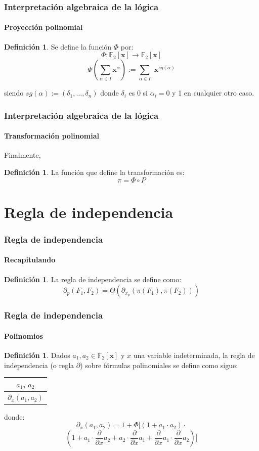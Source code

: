 \documentclass[12pt,a4paper]{beamer}
\theoremstyle{definition}
\newtheorem{defn}[thm]{Definición}
\theoremstyle{remark}
\begin{document}
\begin{frame}
\frametitle{Interpretación algebraica de la lógica}
\framesubtitle{Proyección polinomial}
\begin{defn}
Se define la función $\Phi$ por:
 $$\Phi:\mathbb{F}_2[\textbf{x}] \rightarrow \mathbb{F}_2[\textbf{x}]$$
 $$\Phi (\sum\limits_{\alpha \in I} \textbf{x}^{\alpha} ) := \sum\limits_{\alpha
 \in I} \textbf{ x}^{sg(\alpha)} $$

 \noindent siendo $sg(\alpha) := (\delta_1 ,\dots,\delta_n)$ donde $\delta_i$ es 0 si
 $\alpha_i = 0$ y 1 en cualquier otro caso.
 \end{defn}
\end{frame}

\begin{frame}
\frametitle{Interpretación algebraica de la lógica}
\framesubtitle{Transformación polinomial}
\noindent Finalmente,\\
\vspace{0.5cm}
\begin{defn}
La función que define la transformación es:
$$\pi = \Phi \circ P$$
\end{defn}
\end{frame}

\section{Regla de independencia}
\begin{frame}
\frametitle{Regla de independencia}
\framesubtitle{Recapitulando}
\begin{defn}
La regla de independencia se define como:
$$\partial_p(F_1,F_2) = \Theta (\partial_{x_p} (\pi (F_1),\pi (F_2)))$$
\end{defn}
\end{frame}

\begin{frame}
\frametitle{Regla de independencia}
\framesubtitle{Polinomios}
\begin{defn}
Dados $a_1,a_2 \in \mathbb{F}_2 [\textbf{x}]$ y $x$ una variable indeterminada, la \alert{regla de independencia} (o regla $\partial$) sobre fórmulas polinomiales se define como sigue: \\
\vspace{0.2cm}
\begin{table}[h]
\centering
\begin{tabular}{c}
$a_1$, $a_2$ \\
\hline $\partial_x (a_1,a_2)$
\end{tabular}
\end{table}

\vspace{0.2cm}
\noindent donde:\\
$$\partial_x (a_1, a_2) = 1 + \Phi [(1+a_1 \cdot a_2) \cdot  $$$$ (1+a_1 \cdot \frac{\partial}{\partial x} a_2 + a_2 \cdot \frac{\partial}{\partial x} a_1 + \frac{\partial}{\partial x} a_1 \cdot \frac{\partial}{\partial x} a_2)]$$

\end{defn}
\end{frame}
\end{document}
